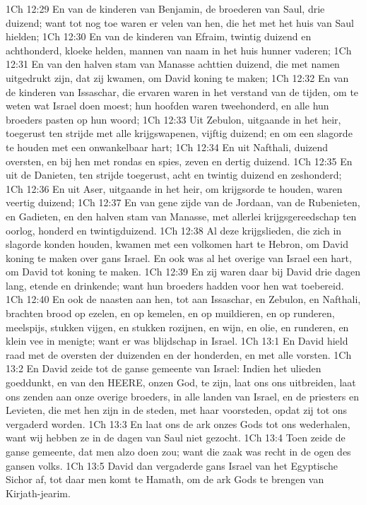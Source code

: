 1Ch 12:29  En van de kinderen van Benjamin, de broederen van Saul, drie duizend; want tot nog toe waren er velen van hen, die het met het huis van Saul hielden;
1Ch 12:30  En van de kinderen van Efraim, twintig duizend en achthonderd, kloeke helden, mannen van naam in het huis hunner vaderen;
1Ch 12:31  En van den halven stam van Manasse achttien duizend, die met namen uitgedrukt zijn, dat zij kwamen, om David koning te maken;
1Ch 12:32  En van de kinderen van Issaschar, die ervaren waren in het verstand van de tijden, om te weten wat Israel doen moest; hun hoofden waren tweehonderd, en alle hun broeders pasten op hun woord;
1Ch 12:33  Uit Zebulon, uitgaande in het heir, toegerust ten strijde met alle krijgswapenen, vijftig duizend; en om een slagorde te houden met een onwankelbaar hart;
1Ch 12:34  En uit Nafthali, duizend oversten, en bij hen met rondas en spies, zeven en dertig duizend.
1Ch 12:35  En uit de Danieten, ten strijde toegerust, acht en twintig duizend en zeshonderd;
1Ch 12:36  En uit Aser, uitgaande in het heir, om krijgsorde te houden, waren veertig duizend;
1Ch 12:37  En van gene zijde van de Jordaan, van de Rubenieten, en Gadieten, en den halven stam van Manasse, met allerlei krijgsgereedschap ten oorlog, honderd en twintigduizend.
1Ch 12:38  Al deze krijgslieden, die zich in slagorde konden houden, kwamen met een volkomen hart te Hebron, om David koning te maken over gans Israel. En ook was al het overige van Israel een hart, om David tot koning te maken.
1Ch 12:39  En zij waren daar bij David drie dagen lang, etende en drinkende; want hun broeders hadden voor hen wat toebereid.
1Ch 12:40  En ook de naasten aan hen, tot aan Issaschar, en Zebulon, en Nafthali, brachten brood op ezelen, en op kemelen, en op muildieren, en op runderen, meelspijs, stukken vijgen, en stukken rozijnen, en wijn, en olie, en runderen, en klein vee in menigte; want er was blijdschap in Israel.
1Ch 13:1  En David hield raad met de oversten der duizenden en der honderden, en met alle vorsten.
1Ch 13:2  En David zeide tot de ganse gemeente van Israel: Indien het ulieden goeddunkt, en van den HEERE, onzen God, te zijn, laat ons ons uitbreiden, laat ons zenden aan onze overige broeders, in alle landen van Israel, en de priesters en Levieten, die met hen zijn in de steden, met haar voorsteden, opdat zij tot ons vergaderd worden.
1Ch 13:3  En laat ons de ark onzes Gods tot ons wederhalen, want wij hebben ze in de dagen van Saul niet gezocht.
1Ch 13:4  Toen zeide de ganse gemeente, dat men alzo doen zou; want die zaak was recht in de ogen des gansen volks.
1Ch 13:5  David dan vergaderde gans Israel van het Egyptische Sichor af, tot daar men komt te Hamath, om de ark Gods te brengen van Kirjath-jearim.
